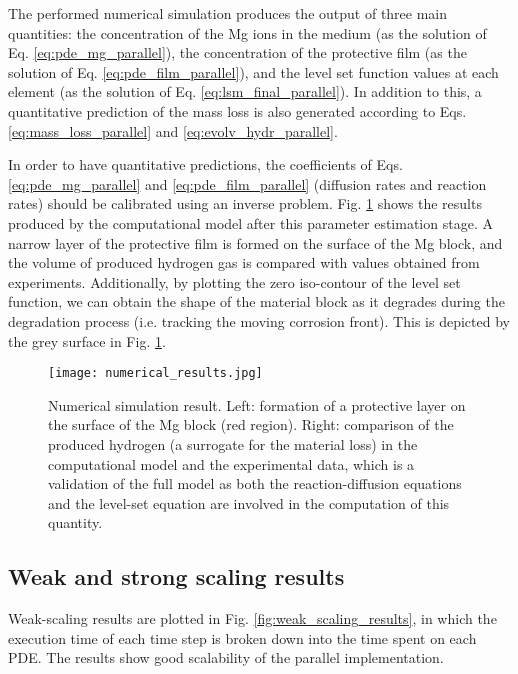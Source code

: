 The performed numerical simulation produces the output of three main quantities: the concentration of the Mg ions in the medium (as the solution of Eq. \ref{eq:pde_mg_parallel}), the concentration of the protective film (as the solution of Eq. \ref{eq:pde_film_parallel}), and the level set function values at each element (as the solution of Eq. \ref{eq:lsm_final_parallel}). In addition to this, a quantitative prediction of the mass loss is also generated according to Eqs. \ref{eq:mass_loss_parallel} and \ref{eq:evolv_hydr_parallel}.

In order to have quantitative predictions, the coefficients of Eqs. \ref{eq:pde_mg_parallel} and \ref{eq:pde_film_parallel} (diffusion rates and reaction rates) should be calibrated using an inverse problem. Fig. \ref{fig:numerical_results} shows the results produced by the computational model after this parameter estimation stage. A narrow layer of the protective film is formed on the surface of the Mg block, and the volume of produced hydrogen gas is compared with values obtained from experiments. Additionally, by plotting the zero iso-contour of the level set function, we can obtain the shape of the material block as it degrades during the degradation process (i.e. tracking the moving corrosion front). This is depicted by the grey surface in Fig. \ref{fig:numerical_results}.

\begin{figure}[h]
\centering
\medskip
\texttt{[image: numerical\_results.jpg]}
\caption[Numerical simulation result of the reaction-diffusion system]{Numerical simulation result. Left: formation of a protective layer on the surface of the Mg block (red region). Right: comparison of the produced hydrogen (a surrogate for the material loss) in the computational model and the experimental data, which is a validation of the full model as both the reaction-diffusion equations and the level-set equation are involved in the computation of this quantity.} \label{fig:numerical_results}
\end{figure}


\subsection{Weak and strong scaling results}

Weak-scaling results are plotted in Fig. \ref{fig:weak_scaling_results}, in which the execution time of each time step is broken down into the time spent on each {PDE}. The results show good scalability of the parallel implementation.

